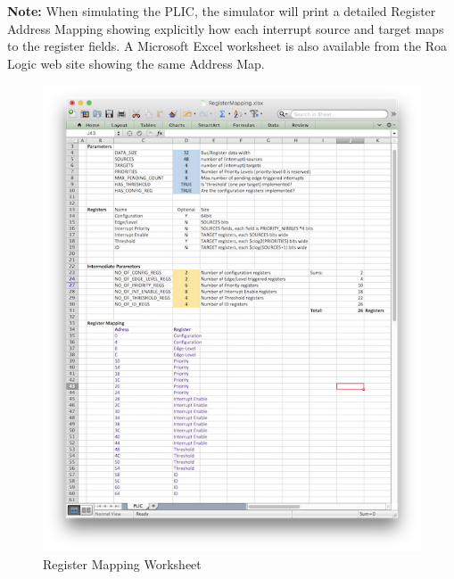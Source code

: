 \textbf{Note:} When simulating the PLIC, the simulator will print a detailed Register Address
Mapping showing explicitly how each interrupt source and target maps to the register fields. A Microsoft Excel worksheet is also available from the Roa Logic web site showing the same Address Map.

\begin{figure}[!ht]
\includegraphics{assets/img/AHB-Lite_PLIC_Worksheet.png}
\caption{Register Mapping Worksheet}
\label{fig:WORKSHEET}
\end{figure}

